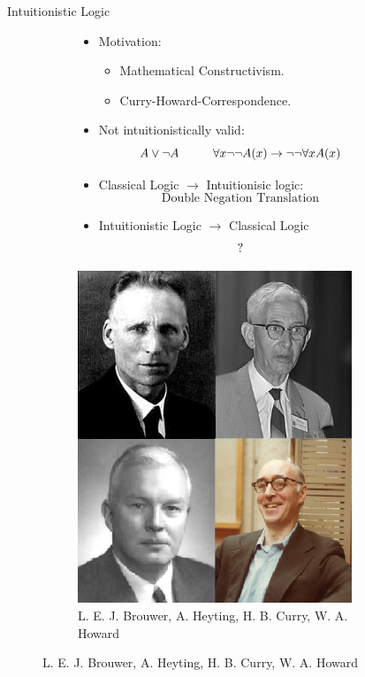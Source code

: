 \documentclass{cubeamer}
\begin{document}
	
	\begin{frame}{Intuitionistic Logic}
		\begin{figure}[!tbp]
			\centering
			\begin{subfigure}[][][t]{0.6\textwidth}
				\begin{itemize}
					\item Motivation:
					\begin{itemize}
						\item Mathematical Constructivism.
						\item Curry-Howard-Correspondence.
					\end{itemize}
					\item Not intuitionistically valid:
					$$A\vee\neg A\hspace*{1cm} \forall x\neg\neg A(x)\to \neg\neg\forall x A(x)$$
					\item Classical Logic $\longrightarrow$ Intuitionisic logic:\[ \text{Double Negation Translation}\]
					\item Intuitionistic Logic $\longrightarrow$ Classical Logic\[\text ?\]
				\end{itemize}
			\end{subfigure}
			\hfill
			\begin{subfigure}[]{0.3\textwidth}
				\centering
				\includegraphics[width=0.9\textwidth]{logicians.png}
				\caption{L. E. J. Brouwer, A. Heyting, H. B. Curry, W. A. Howard}
			\end{subfigure}
		\end{figure}
	\end{frame}
		
\end{document}
